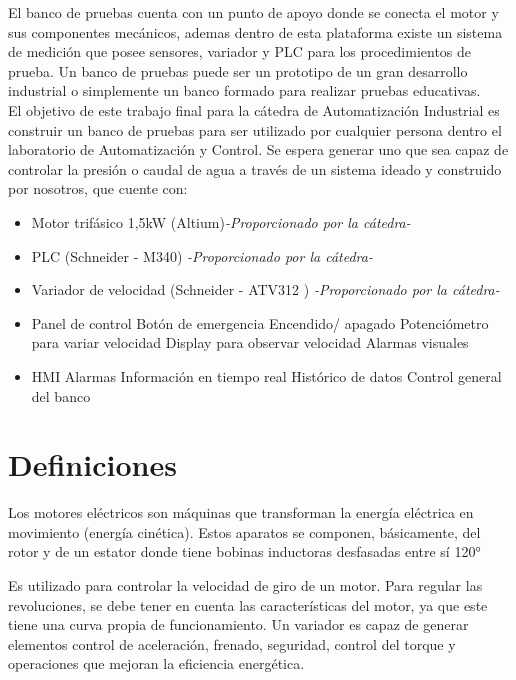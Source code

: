 El banco de pruebas cuenta con un punto de apoyo donde se conecta el motor y sus componentes mecánicos, ademas dentro de esta plataforma existe un sistema de medición que posee sensores, variador y PLC para los procedimientos de prueba.
Un banco de pruebas puede ser un prototipo de un gran desarrollo industrial o simplemente un banco formado para realizar pruebas educativas. \\

El objetivo de este trabajo final para la cátedra de Automatización Industrial es construir un banco de pruebas para ser utilizado por cualquier persona dentro el laboratorio de Automatización y Control. Se espera generar uno que sea capaz de controlar la presión o caudal de agua a través de un sistema ideado y construido por nosotros, que cuente con:
\begin{itemize}
    \item Motor trifásico 1,5kW (Altium)\textit{-Proporcionado por la cátedra-}
    \item PLC (Schneider - M340) \textit{-Proporcionado por la cátedra-}
    \item Variador de velocidad (Schneider - ATV312 ) \textit{-Proporcionado por la cátedra-}
    \item Panel de control
        \subitem Botón de emergencia
        \subitem Encendido/ apagado
        \subitem Potenciómetro para variar velocidad
        \subitem Display para observar velocidad
        \subitem Alarmas visuales
    \item HMI
        \subitem Alarmas
        \subitem Información en tiempo real
        \subitem Histórico de datos
        \subitem Control general del banco
\end{itemize}


\newpage

\section{Definiciones}
\begin{tcolorbox}[colback=blue!5!white,colframe=blue!75!black,title=Motor eléctrico]
	Los motores eléctricos son máquinas que transforman la energía eléctrica en movimiento (energía cinética). Estos aparatos se componen, básicamente, del rotor y de un estator donde tiene bobinas inductoras desfasadas entre sí 120°
\end{tcolorbox}

\begin{tcolorbox}[colback=blue!5!white,colframe=blue!75!black,title=Variador de velocidad]
	Es utilizado para controlar la velocidad de giro de un motor.
	Para regular las revoluciones, se debe tener en cuenta las características del motor, ya que este tiene una curva propia de funcionamiento. Un variador es capaz de generar elementos control de aceleración, frenado, seguridad, control del torque y operaciones que mejoran la eficiencia energética.
\end{tcolorbox}

